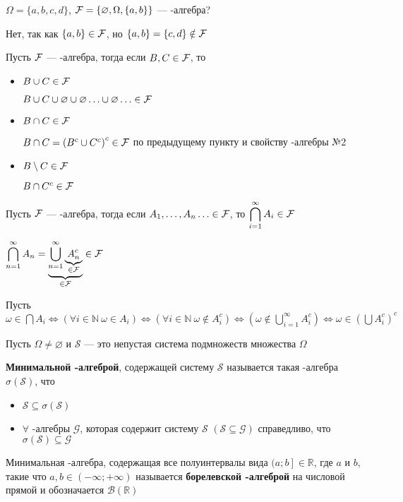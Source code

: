 \documentclass[a4paper, 10pt]{article}
\begin{document}
\ex $\Omega=\{a,b,c,d\}$, $\mathcal{F}=\{\varnothing,\Omega,\{a,b\}\}$ — \s-алгебра?

Нет, так как $\{a,b\}\in\mathcal{F}$, но $\{a,b\}=\{c,d\}\notin\mathcal{F}$

\state Пусть $\mathcal{F}$ — \s-алгебра, тогда если $B,C\in\mathcal{F}$, то
\begin{itemize}
    \item $B\cup C\in\mathcal{F}$
    
    \proof $B\cup C\cup \varnothing \cup \varnothing\ldots\cup \varnothing\ldots\in\mathcal{F}$
    \item $B\cap C\in\mathcal{F}$
    
    \proof $B\cap C=\left(B^c\cup C^c\right)^c\in\mathcal{F}$ по предыдущему пункту и свойству \s-алгебры №2
    \item $B\setminus C\in\mathcal{F}$
    
    \proof $B\cap C^c\in\mathcal{F}$
\end{itemize}

\state Пусть $\mathcal{F}$ — \s-алгебра, тогда если $A_1,\ldots,A_n\ldots\in\mathcal{F}$, то $\displaystyle\bigcap_{i=1}^{\infty}A_i\in\mathcal{F}$

\proof $\displaystyle\bigcap_{n=1}^{\infty}A_n=\underbrace{\bigcup_{n=1}^{\infty}\underbrace{A_n^c}_{\in\mathcal{F}}}_{\in\mathcal{F}}\in\mathcal{F}$

Пусть $\omega\in\displaystyle\bigcap A_i\Longleftrightarrow(\forall i\in\mathbb{N}\ \omega\in A_i)\Longleftrightarrow(\forall i\in\mathbb{N}\ \omega\notin A_i^c)\Longleftrightarrow(\omega\notin\displaystyle\bigcup_{i=1}^{\infty} A_i^c)\Longleftrightarrow\omega\in(\displaystyle\bigcup A_i^c)^c$

 Пусть $\Omega\neq\varnothing$ и $\mathcal{S}$ — это непустая система подмножеств множества $\Omega$

\textbf{Минимальной \s-алгеброй}, содержащей систему $\mathcal{S}$ называется такая \s-алгебра $\sigma(\mathcal{S})$, что
\begin{itemize}
    \item $\mathcal{S}\subseteq\sigma(\mathcal{S})$
    \item $\forall$ \s-алгебры $\mathcal{G}$, которая содержит систему $\mathcal{S}$ $(\mathcal{S}\subseteq\mathcal{G})$ справедливо, что $\sigma(\mathcal{S})\subseteq\mathcal{G}$
\end{itemize}

 Минимальная \s-алгебра, содержащая все полуинтервалы вида $\left.(a;b\right]\in\mathbb{R}$, где $a$ и $b$, такие что $a,b\in(-\infty;+\infty)$ называется \textbf{борелевской \s-алгеброй} на числовой прямой и обозначается $\mathcal{B}(\mathbb{R})$
\end{document}
